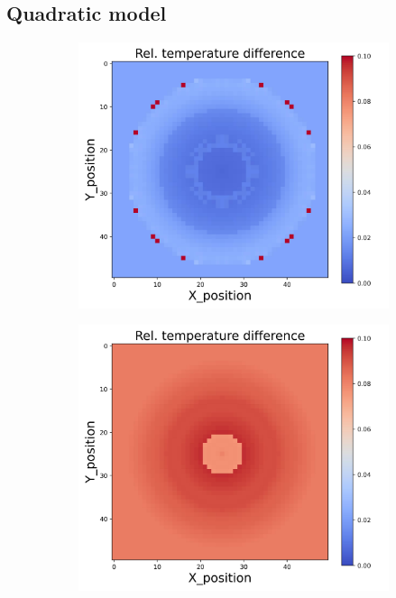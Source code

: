 \subsection{Quadratic model}
\begin{figure}[h]
    \centering
    \begin{minipage}{\textwidth}
        \centering
        \begin{subfigure}{0.3\textwidth}
            \centering
            \includegraphics[width=\textwidth]{figures/raw_data/0/quad/T_bias.jpg}
        \end{subfigure}
        \begin{subfigure}{0.3\textwidth}
            \centering
            \includegraphics[width=\textwidth]{figures/raw_data/5/quad/T_bias.jpg}

\end{subfigure}
\end{minipage}
\end{figure}
